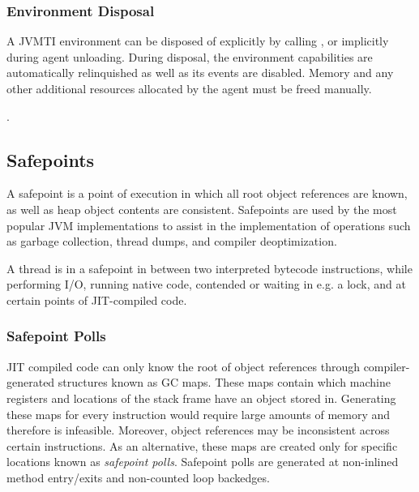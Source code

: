 \subsubsection*{Environment Disposal}

A JVMTI environment can be disposed of explicitly by calling , or implicitly during agent unloading. During disposal, the environment capabilities are automatically relinquished as well as its events are disabled. Memory and any other additional resources allocated by the agent must be freed manually.

.

\subsection{Safepoints}

A safepoint is a point of execution in which all root object references are known, as well as heap object contents are consistent. Safepoints are used by the most popular JVM implementations to assist in the implementation of operations such as garbage collection, thread dumps, and compiler deoptimization.

A thread is in a safepoint in between two interpreted bytecode instructions, while performing I/O, running native code, contended or waiting in e.g. a lock, and at certain points of JIT-compiled code.

\subsubsection*{Safepoint Polls}

JIT compiled code can only know the root of object references through compiler-generated structures known as GC maps. These maps contain which machine registers and locations of the stack frame have an object stored in. Generating these maps for every instruction would require large amounts of memory and therefore is infeasible. Moreover, object references may be inconsistent across certain instructions. As an alternative, these maps are created only for specific locations known as \emph{safepoint polls}. Safepoint polls are generated at non-inlined method entry/exits and non-counted loop backedges.

